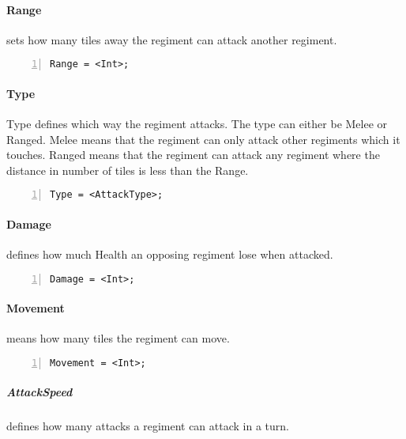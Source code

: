 		\paragraph{Range} sets how many tiles away the regiment can attack another regiment. 
		
\begin{lstlisting}[basicstyle=\small\sffamily,
keywordstyle={\color{blue}},
comment={[l]{//}}, morecomment={[s]{/*}{*/}}, commentstyle=\itshape,
columns={[l]flexible}, numbers=left, numberstyle=\tiny,
frameround=fftt, frame=shadowbox, captionpos=b,
caption={Range}]
Range = <Int>;
\end{lstlisting}
		\paragraph{Type}
			Type defines which way the regiment attacks. The type can either be Melee or Ranged.
			Melee means that the regiment can only attack other regiments which it touches. Ranged means 
			that the regiment can attack any regiment where the distance in number of tiles is less than the Range.

		\begin{lstlisting}[basicstyle=\small\sffamily,
		keywordstyle={\color{blue}},
		comment={[l]{//}}, morecomment={[s]{/*}{*/}}, commentstyle=\itshape,
		columns={[l]flexible}, numbers=left, numberstyle=\tiny,
		frameround=fftt, frame=shadowbox, captionpos=b,
		caption={Type of regiment}]
Type = <AttackType>; 
			\end{lstlisting}	
		\paragraph{Damage} defines how much Health an opposing regiment lose when attacked.

		\begin{lstlisting}[basicstyle=\small\sffamily,
		keywordstyle={\color{blue}},
		comment={[l]{//}}, morecomment={[s]{/*}{*/}}, commentstyle=\itshape,
		columns={[l]flexible}, numbers=left, numberstyle=\tiny,
		frameround=fftt, frame=shadowbox, captionpos=b,
		caption={Damage of the regiment}]
Damage = <Int>;
			\end{lstlisting}
		\paragraph{Movement} means how many tiles the regiment can move.

		\begin{lstlisting}[basicstyle=\small\sffamily,
		keywordstyle={\color{blue}},
		comment={[l]{//}}, morecomment={[s]{/*}{*/}}, commentstyle=\itshape,
		columns={[l]flexible}, numbers=left, numberstyle=\tiny,
		frameround=fftt, frame=shadowbox, captionpos=b,
		caption={Movement of the regiment}]
Movement = <Int>;
			\end{lstlisting}
		\subparagraph{AttackSpeed} defines how many attacks a regiment can attack in a turn.

